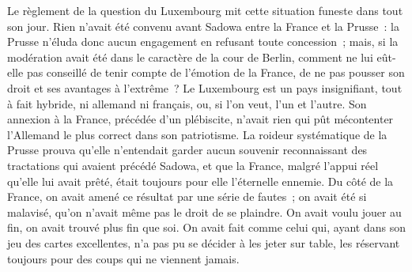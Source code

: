 \documentclass[french,twoside]{book} %
\begin{document}
Le règlement de la question du Luxembourg mit cette situation funeste dans tout son jour. Rien n’avait été convenu avant Sadowa entre la France et la Prusse : la Prusse n’éluda donc aucun engagement en refusant toute concession ; mais, si la modération avait été dans le caractère de la cour de Berlin, comment ne lui eût-elle pas conseillé de tenir compte de l’émotion de la France, de ne pas pousser son droit et ses avantages à l’extrême ? Le Luxembourg est un pays insignifiant, tout à fait hybride, ni allemand ni français, ou, si l’on veut, l’un et l’autre. Son annexion à la France, précédée d’un plébiscite, n’avait rien qui pût mécontenter l’Allemand le plus correct dans son patriotisme. La roideur systématique de la Prusse prouva qu’elle n’entendait garder aucun souvenir reconnaissant des tractations qui avaient précédé Sadowa, et que la France, malgré l’appui réel qu’elle lui avait prêté, était toujours pour elle l’éternelle ennemie. Du côté de la France, on avait amené ce résultat par une série de fautes ; on avait été si malavisé, qu’on n’avait même pas le droit de se plaindre. On avait voulu jouer au fin, on avait trouvé plus fin que soi. On avait fait comme celui qui, ayant dans son jeu des cartes excellentes, n’a pas pu se décider à les jeter sur table, les réservant toujours pour des coups qui ne viennent jamais.\par
\end{document}
